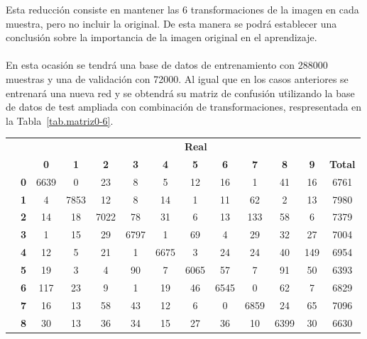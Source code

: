 \begin{description}
	Esta reducción consiste en mantener las 6 transformaciones de la imagen en cada muestra, pero no incluir la original. De esta manera se podrá establecer una conclusión sobre la importancia de la imagen original en el aprendizaje.\\
	\vspace{-10pt}
	\\
	En esta ocasión se tendrá una base de datos de entrenamiento con 288000 muestras y una de validación con 72000. Al igual que en los casos anteriores se entrenará una nueva red y se obtendrá su matriz de confusión utilizando la base de datos de test ampliada con combinación de transformaciones, respresentada en la Tabla~\ref{tab.matriz0-6}.
	\begin{table}[H]
		\centering
		\begin{tabular}{|c|l|c|c|c|c|c|c|c|c|c|c|c|}
			\cline{3-13} 
			\multicolumn{2}{c|}{} & \multicolumn{11}{c|}{\textbf{Real}} \\ \cline{3-13} 
			\multicolumn{2}{c|}{} & \textbf{0} & \textbf{1} & \textbf{2} &  \textbf{3} & \textbf{4} & \textbf{5} & \textbf{6} & \textbf{7} & \textbf{8} & \textbf{9} & \textbf{Total}\\ \hline
			\multirow{10}{0.5cm}{\rotatebox{90}{\textbf{Predicción}}}& \textbf{0} & \cellcolor{lightgray}6639 & 0 & 23 & 8 & 5 & 12 & 16 & 1 & 41 & 16 & 6761\\ \cline{2-13}
			& \textbf{1} & 4 & \cellcolor{lightgray}7853 & 12 & 8 & 14 & 1 & 11 & 62 & 2 & 13 & 7980\\ \cline{2-13}
			& \textbf{2} & 14 & 18 & \cellcolor{lightgray}7022 & 78 & 31 & 6 & 13 & 133 & 58 & 6 & 7379\\ \cline{2-13}
			& \textbf{3} & 1 & 15 & 29 & \cellcolor{lightgray}6797 & 1 & 69 & 4 & 29 & 32 & 27 & 7004\\ \cline{2-13}
			& \textbf{4} & 12 & 5 & 21 & 1 & \cellcolor{lightgray}6675 & 3 & 24 & 24 & 40 & 149 & 6954\\ \cline{2-13}
			& \textbf{5} & 19 & 3 & 4 & 90 & 7 & \cellcolor{lightgray}6065 & 57 & 7 & 91 & 50 & 6393\\ \cline{2-13}
			& \textbf{6} & 117 & 23 & 9 & 1 & 19 & 46 & \cellcolor{lightgray}6545 & 0 & 62 & 7 & 6829\\ \cline{2-13}
			& \textbf{7} & 16 & 13 & 58 & 43 & 12 & 6 & 0 & \cellcolor{lightgray}6859 & 24 & 65 & 7096\\ \cline{2-13}
			& \textbf{8} & 30 & 13 & 36 & 34 & 15 & 27 & 36 & 10 & \cellcolor{lightgray}6399 & 30 & 6630\\ \cline{2-13}

\end{tabular}
\end{table}
\end{description}
